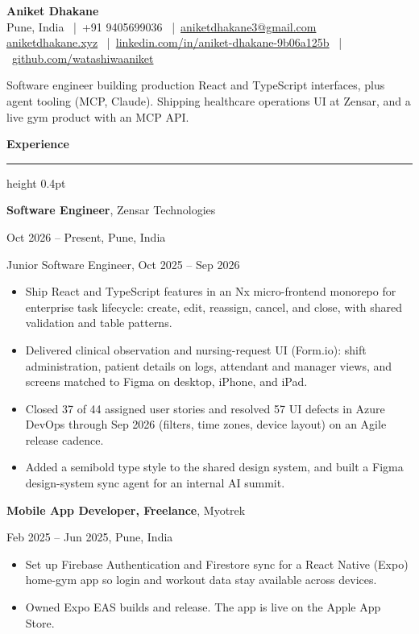 \documentclass[letterpaper,10pt]{article}
\newcommand{\rsection}[1]{%
  \vspace{6pt}%
  {\bfseries #1}\par
  \vspace{1pt}%
  \hrule height 0.4pt
  \vspace{3pt}%
}
\newcommand{\role}[4]{%
  \textbf{#1}, #3\par
  #2, #4\par
  \vspace{2pt}%
}
\begin{document}
\begin{center}
  {\LARGE\bfseries Aniket Dhakane}\\[3pt]
  Pune, India \ |\ +91 9405699036 \ |\ \href{mailto:aniketdhakane3@gmail.com}{aniketdhakane3@gmail.com}\\[2pt]
  \href{https://www.aniketdhakane.xyz}{aniketdhakane.xyz}
  \ |\ \href{https://www.linkedin.com/in/aniket-dhakane-9b06a125b/}{linkedin.com/in/aniket-dhakane-9b06a125b}
  \ |\ \href{https://github.com/watashiwaaniket}{github.com/watashiwaaniket}
\end{center}

\vspace{2pt}
\noindent Software engineer building production React and TypeScript interfaces, plus agent tooling (MCP, Claude). Shipping healthcare operations UI at Zensar, and a live gym product with an MCP API.

\rsection{Experience}

\textbf{Software Engineer}, Zensar Technologies\par
Oct 2026 -- Present, Pune, India\par
Junior Software Engineer, Oct 2025 -- Sep 2026
\vspace{2pt}
\begin{itemize}
  \item Ship React and TypeScript features in an Nx micro-frontend monorepo for enterprise task lifecycle: create, edit, reassign, cancel, and close, with shared validation and table patterns.
  \item Delivered clinical observation and nursing-request UI (Form.io): shift administration, patient details on logs, attendant and manager views, and screens matched to Figma on desktop, iPhone, and iPad.
  \item Closed 37 of 44 assigned user stories and resolved 57 UI defects in Azure DevOps through Sep 2026 (filters, time zones, device layout) on an Agile release cadence.
  \item Added a semibold type style to the shared design system, and built a Figma design-system sync agent for an internal AI summit.
\end{itemize}

\vspace{4pt}
\role{Mobile App Developer, Freelance}{Feb 2025 -- Jun 2025}{Myotrek}{Pune, India}
\begin{itemize}
  \item Set up Firebase Authentication and Firestore sync for a React Native (Expo) home-gym app so login and workout data stay available across devices.
  \item Owned Expo EAS builds and release. The app is live on the Apple App Store.
\end{itemize}
\end{document}
